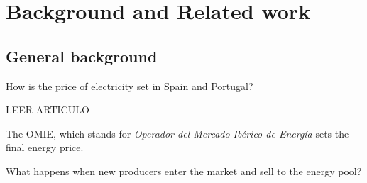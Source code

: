 \documentclass[12pt]{report} %
\begin{document}
\chapter{Background and Related work}




\section{General background}
How is the price of electricity set in Spain and Portugal?

LEER ARTICULO \cite{precio_electricidad_edem}

The OMIE, which stands for \textit{Operador del Mercado Ibérico de Energía} sets the final energy price.


What happens when new producers enter the market and sell to the energy pool?
\end{document}
